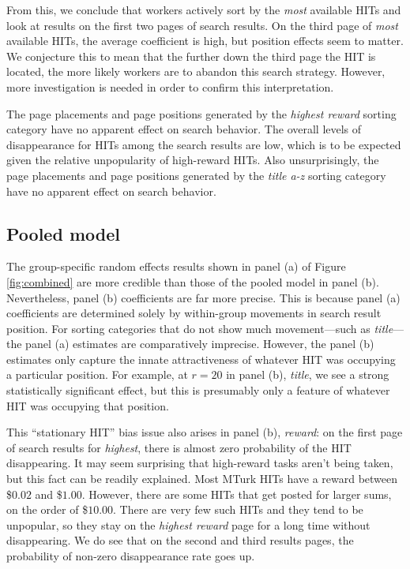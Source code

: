 \documentclass{sig-alternate}
\begin{document}
From this, we conclude that workers actively sort by the {\em most}
available HITs and look at results on the first two pages of search
results.  On the third page of {\em most} available HITs, the average
coefficient is high, but position effects seem to matter.  We
conjecture this to mean that the further down the third page the HIT
is located, the more likely workers are to abandon this search
strategy.  However, more investigation is needed in order to confirm
this interpretation.

The page placements and page positions generated by the {\em highest
  reward} sorting category have no apparent effect on search behavior.
The overall levels of disappearance for HITs among the search results
are low, which is to be expected given the relative unpopularity of
high-reward HITs.  Also unsurprisingly, the page placements and page
positions generated by the {\em title a-z} sorting category have no
apparent effect on search behavior.

\subsection{Pooled model}
The group-specific random effects results shown in panel (a) of Figure
\ref{fig:combined} are more credible than those of the pooled model in
panel (b).  Nevertheless, panel (b) coefficients are far more precise.
This is because panel (a) coefficients are determined solely by
within-group movements in search result position.  For sorting
categories that do not show much movement---such as {\em title}---the
panel (a) estimates are comparatively imprecise.  However, the panel
(b) estimates only capture the innate attractiveness of whatever HIT
was occupying a particular position.  For example, at $r=20$ in panel
(b), {\em title}, we see a strong statistically significant effect,
but this is presumably only a feature of whatever HIT was occupying
that position.

This ``stationary HIT'' bias issue also arises in panel (b), {\em
  reward}: on the first page of search results for {\em highest},
there is almost zero probability of the HIT disappearing. It may seem surprising that high-reward tasks aren't being taken, but this fact can be readily explained.  Most MTurk HITs have a reward between \$$0.02$ and
\$$1.00$.  However, there are some HITs that get posted for larger
sums, on the order of \$$10.00$.  There are very few such HITs and
they tend to be unpopular, so they stay on the {\em highest reward}
page for a long time without disappearing.  We do see that on the
second and third results pages, the probability of non-zero
disappearance rate goes up.
\end{document}
